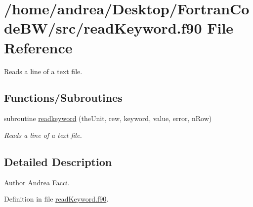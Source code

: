 \hypertarget{read_keyword_8f90}{\section{/home/andrea/\-Desktop/\-Fortran\-Code\-B\-W/src/read\-Keyword.f90 File Reference}
\label{read_keyword_8f90}
}


Reads a line of a text file.  


\subsection*{Functions/\-Subroutines}
\begin{DoxyCompactItemize}
\item 
subroutine \hyperlink{read_keyword_8f90_a25147e00369196a9059879141682718f}{readkeyword} (the\-Unit, rew, keyword, value, error, n\-Row)
\begin{DoxyCompactList}\small\item\em Reads a line of a text file. \end{DoxyCompactList}\end{DoxyCompactItemize}


\subsection{Detailed Description}
\begin{DoxyAuthor}{Author}
Andrea Facci. 
\end{DoxyAuthor}


Definition in file \hyperlink{read_keyword_8f90_source}{read\-Keyword.\-f90}.



